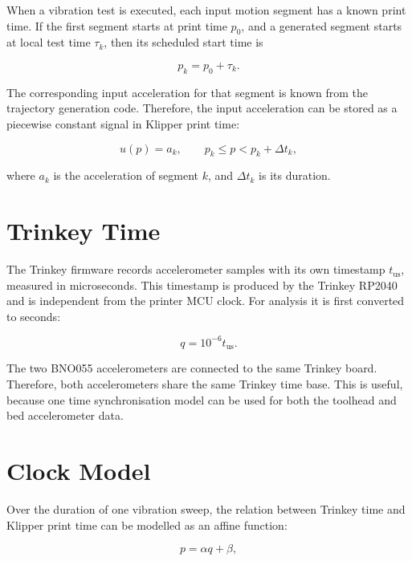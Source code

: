 \documentclass[11pt,a4paper]{article}
\begin{document}
When a vibration test is executed, each input motion segment has a known print
time. If the first segment starts at print time \(p_0\), and a generated segment
starts at local test time \(\tau_k\), then its scheduled start time is

\begin{equation}
    p_k = p_0 + \tau_k.
\end{equation}

The corresponding input acceleration for that segment is known from the
trajectory generation code. Therefore, the input acceleration can be stored as a
piecewise constant signal in Klipper print time:

\begin{equation}
    u(p) = a_k, \qquad p_k \leq p < p_k + \Delta t_k,
\end{equation}

where \(a_k\) is the acceleration of segment \(k\), and \(\Delta t_k\) is its
duration.

\section{Trinkey Time}

The Trinkey firmware records accelerometer samples with its own timestamp
\(t_{\mathrm{us}}\), measured in microseconds. This timestamp is produced by the
Trinkey RP2040 and is independent from the printer MCU clock. For analysis it is
first converted to seconds:

\begin{equation}
    q = 10^{-6} t_{\mathrm{us}}.
\end{equation}

The two BNO055 accelerometers are connected to the same Trinkey board. Therefore,
both accelerometers share the same Trinkey time base. This is useful, because
one time synchronisation model can be used for both the toolhead and bed
accelerometer data.

\section{Clock Model}

Over the duration of one vibration sweep, the relation between Trinkey time and
Klipper print time can be modelled as an affine function:

\begin{equation}
    p = \alpha q + \beta,
    \label{eq:clock_model}
\end{equation}
\end{document}
